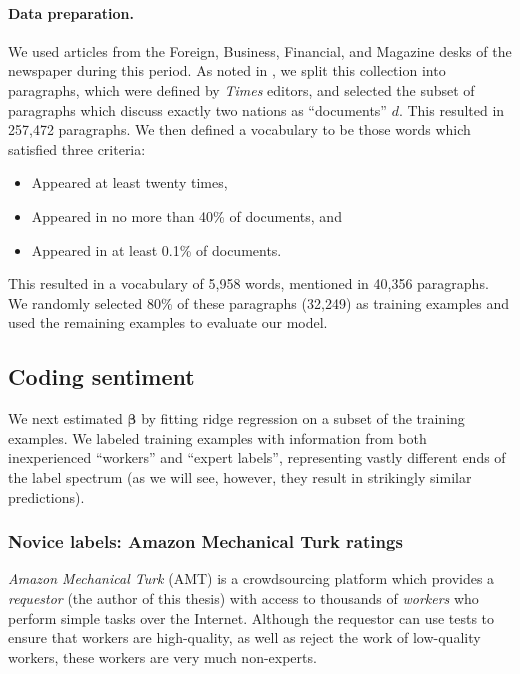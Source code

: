 \paragraph{Data preparation.}
We used articles from the Foreign, Business, Financial, and Magazine
desks of the newspaper during this period. As noted in
, we split this collection into paragraphs,
which were defined by \emph{Times} editors, and selected the subset of paragraphs
which discuss exactly two nations as ``documents'' $d$.  This resulted
in 257,472 paragraphs.  We then defined a vocabulary to be those words
which satisfied three criteria:
\begin{itemize}
  \item Appeared at least twenty times,
  \item Appeared in no more than 40\% of documents, and
  \item Appeared in at least 0.1\% of documents.
\end{itemize}
This resulted in a vocabulary of 5,958 words, mentioned in 40,356
paragraphs. We randomly selected 80\% of these paragraphs (32,249) as
training examples and used the remaining examples to evaluate our
model.

\subsection{Coding sentiment}
\label{section:sentiment_models}

We next estimated $\bm \beta$ by fitting ridge regression on a subset
of the training examples.  We labeled training examples with
information from both inexperienced ``workers'' and ``expert labels'',
representing vastly different ends of the label spectrum (as we will
see, however, they result in strikingly similar predictions).

\subsubsection{Novice labels: Amazon Mechanical Turk ratings}
\label{section:mturk}

\emph{Amazon Mechanical Turk} (AMT) is a crowdsourcing platform which
provides a \emph{requestor} (the author of this thesis) with access to
thousands of \emph{workers} who perform simple tasks over the
Internet.  Although the requestor can use tests to ensure that workers
are high-quality, as well as reject the work of low-quality workers,
these workers are very much non-experts.

